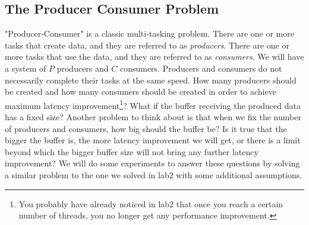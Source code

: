 \subsection{The Producer Consumer Problem}
"Producer-Consumer" is a classic multi-tasking problem. There are one or more tasks that create data, and they are referred to as {\em producers}. There are one or more tasks that use the data, and they are referred to as {\em consumers}. We will have a system of $P$ producers and $C$ consumers. Producers and consumers do not necessarily complete their tasks at the same speed. How many producers should be created and how many consumers should be created in order to achieve maximum latency improvement\footnote{You probably have already noticed in lab2 that once you reach a certain number of threads, you no longer get any performance improvement.}? What if the buffer receiving the produced data has a fixed size? Another problem to think about is that when we fix the number of producers and consumers, how big should the buffer be? Is it true that the bigger the buffer is, the more latency improvement we will get, or there is a limit beyond which the bigger buffer size will not bring any further latency improvement? We will do some experiments to answer these questions by solving a similar problem to the one we solved in lab2 with some additional assumptions.

